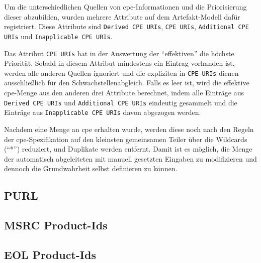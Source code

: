 Um die unterschiedlichen Quellen von \acrshort{cpe}-Informationen und die Priorisierung dieser abzubilden, wurden mehrere Attribute auf dem Artefakt-Modell dafür registriert.
Diese Attribute sind \texttt{Derived CPE URIs}, \texttt{CPE URIs}, \texttt{Additional CPE URIs} und \texttt{Inapplicable CPE URIs}.

Das Attribut \texttt{CPE URIs} hat in der Auswertung der \enquote{effektiven}  die höchste Priorität.
Sobald in diesem Attribut mindestens ein Eintrag vorhanden ist, werden alle anderen Quellen ignoriert und die expliziten  in \texttt{CPE URIs} dienen ausschließlich für den Schwachstellenabgleich.
Falls es leer ist, wird die effektive \acrshort{cpe}-Menge aus den anderen drei Attribute berechnet, indem alle Einträge aus \texttt{Derived CPE URIs} und \texttt{Additional CPE URIs} eindeutig gesammelt und die Einträge aus \texttt{Inapplicable CPE URIs} davon abgezogen werden.

Nachdem eine Menge an \acrshort{cpe} erhalten wurde, werden diese noch nach den Regeln der \acrshort{cpe}-Spezifikation auf den kleinsten gemeinsamen Teiler über die Wildcards (\enquote{*}) reduziert, und Duplikate werden entfernt.
Damit ist es möglich, die Menge der automatisch abgeleiteten  mit manuell gesetzten Eingaben zu modifizieren und dennoch die Grundwahrheit selbst definieren zu können.

\subsection{PURL}

\subsection{MSRC Product-Ids}\label{subsec:msrc-product-ids}


\subsection{EOL Product-Ids}



